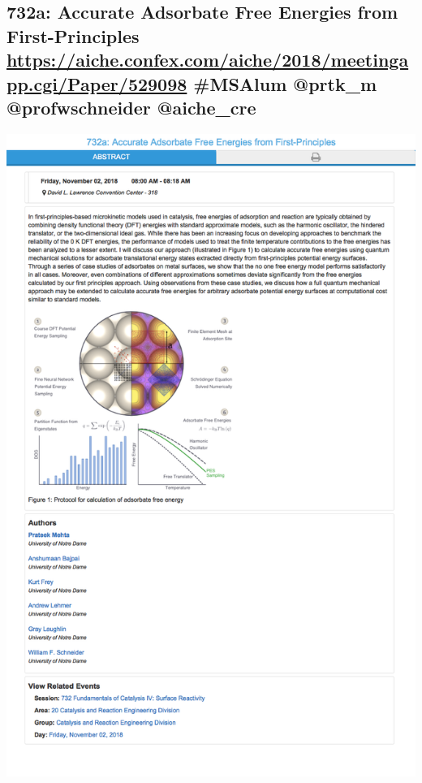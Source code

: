 \documentclass[11pt]{article}
\begin{document}
\subsection{732a: Accurate Adsorbate Free Energies from First-Principles \url{https://aiche.confex.com/aiche/2018/meetingapp.cgi/Paper/529098} \#MSAlum  @prtk\_m @profwschneider @aiche\_cre}
\label{sec:org42b44df}
\begin{center}
\includegraphics[width=.9\linewidth]{./529098.png}
\end{center}
\end{document}
